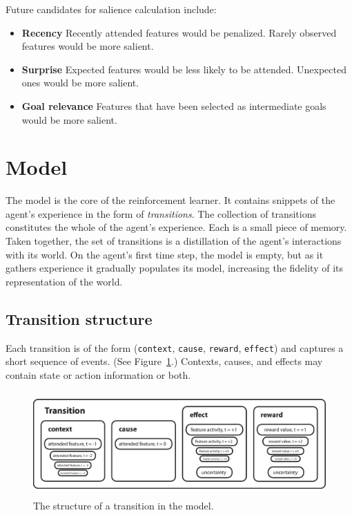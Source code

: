 Future candidates for salience calculation include:

\begin{itemize}
\item {\bf Recency}  Recently attended features would be penalized. Rarely observed features would be more salient.
\item {\bf Surprise} Expected features would be less likely to be attended. Unexpected ones would be more salient.
\item {\bf Goal relevance} Features that have been selected as intermediate goals would be more salient.
\end{itemize}


\section{Model}
The model is the core of the reinforcement learner. It contains snippets of the agent's experience in the form of {\em transitions}. The collection of transitions constitutes the whole of the agent's experience. Each is a small piece of memory. Taken together, the set of transitions is a distillation of the agent's interactions with its world. On the agent's first time step, the model is empty, but as it gathers experience it gradually populates its model, increasing the fidelity of its representation of the world. 

\subsection{Transition structure}

Each transition is of the form (\texttt{context}, \texttt{cause}, \texttt{reward}, \texttt{effect}) and captures a short sequence of events. (See Figure~\ref{transition_structure}.) Contexts, causes, and effects may contain state or action information or both.

\begin{figure}
\centering
\includegraphics[height=4cm]{figs/transition.eps}
\caption{The structure of a transition in the model.}
\label{transition_structure}
\end{figure}

